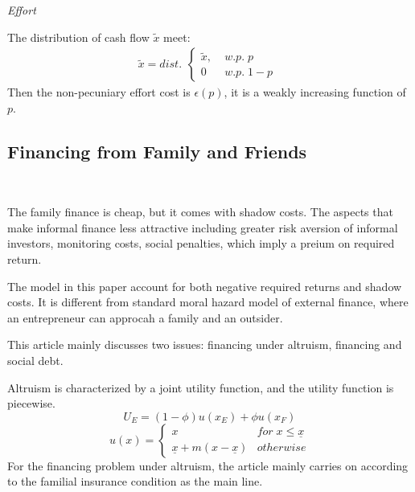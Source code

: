 \documentclass{article}
\begin{document}
    \emph{Effort}

    The distribution of cash flow $\tilde{x}$ meet: 
    \begin{equation}
        \tilde{x}=dist.\begin{aligned}
            \begin{cases}
                \tilde{x},\;&w.p.\;p \\
                0\;&w.p.\;1-p
            \end{cases}
        \end{aligned}
    \end{equation}
    Then the non-pecuniary effort cost is $\epsilon(p)$, it is a weakly increasing function of $p$.
    

    


\subsection{Financing from Family and Friends}
    ~\

    The family finance is cheap, but it comes with shadow costs. The aspects that make informal finance less attractive including 
    greater risk aversion of informal investors, monitoring costs, social penalties, which imply a preium on required return. 

    The model in this paper account for both negative required returns and shadow costs. It is different
    from standard moral hazard model of external finance, where an entrepreneur can approcah a family and an outsider.  

    This article mainly discusses two issues: financing under altruism, financing and social debt.

    Altruism is characterized by a joint utility function, and the utility function is piecewise. 
    \begin{equation}
        U_E=(1-\phi)u(x_E)+\phi u(x_F)
    \end{equation}
    \begin{equation}
        u(x)=\begin{cases}
            x& for\; x\leq \underline{x}  \\

            \underline{x}+m(x-\underline{x})& otherwise
        \end{cases}
    \end{equation}
    For the financing problem under altruism, the article mainly carries on according to the familial insurance condition as the main line.
   
\end{document}
